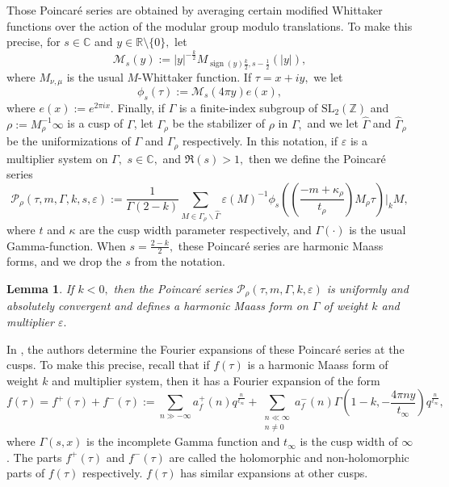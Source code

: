 \documentclass[10pt]{amsart}
\newtheorem{lemma}[theorem]{Lemma}
\theoremstyle{definition}
\theoremstyle{remark}
\numberwithin{equation}{section}
\DeclareMathOperator{\sign}{sign}
\newcommand{\C}{\mathbb C}
\newcommand{\SL}{\mathrm{SL}}
\newcommand{\RR}{\mathbb R}
\newcommand{\Z}{\mathbb Z}
\begin{document}
	Those Poincar\'e series are obtained by averaging certain modified Whittaker functions over the action of the modular group modulo translations. To make this precise,  for $s\in\C$ and $y\in\RR\setminus\{0\},$ let
	$$
	\mathcal{M}_s(y):=|y|^{-\frac{k}{2}}M_{\sign(y)\frac{k}{2},s-\frac{1}{2}}(|y|),
	$$
	where $M_{\nu,\mu}$ is the usual $M$-Whittaker function. If $\tau=x+iy,$ we let
	\begin{equation}\label{PoincareComponent}
		\phi_s(\tau):=\mathcal{M}_s(4\pi y)e(x),
	\end{equation}
	where $e(x):=e^{2\pi i x}.$ Finally, if $\Gamma$ is a finite-index subgroup of $\SL_2(\Z)$ and $\rho:=M_\rho^{-1}\infty$ is a cusp of $\Gamma$, let $\Gamma_\rho$ be the stabilizer of $\rho$ in $\Gamma,$ and we let $\widehat{\Gamma}$ and $\widehat{\Gamma}_\rho$ be the uniformizations of $\Gamma$ and $\Gamma_\rho$ respectively. 
	In this notation, if $\varepsilon$ is a multiplier system on $\Gamma,$  $s\in\C,$ and $\Re(s)>1,$ then we define the Poincar\'e series
	$$
	\mathcal{P}_{\rho}(\tau,m,\Gamma,k,s,\varepsilon):=\frac{1}{\Gamma(2-k)}\sum\limits_{M\in\widehat{\Gamma}_\rho\backslash\widehat{\Gamma}}\varepsilon(M)^{-1}\phi_s\left(\left(\frac{-m+\kappa_\rho}{t_\rho}\right) M_\rho\tau\right)\Bigg|_{k}M,
	$$ 
	where $t$ and $\kappa$ are the cusp width parameter respectively, and  $\Gamma(\cdot)$ is the usual Gamma-function. When $s=\frac{2-k}{2},$ these Poincar\'e series are harmonic Maass forms, and we drop the $s$ from the notation.
	
	\begin{lemma}
		If $k<0,$ then the Poincar\'e series $\mathcal{P}_{\rho}(\tau,m,\Gamma,k,\varepsilon)$ is uniformly and absolutely convergent and defines a harmonic Maass form on $\Gamma$ of weight $k$ and multiplier $\varepsilon.$
	\end{lemma}
	
	In \cite{BringmannOno}, the authors determine the Fourier expansions of these Poincar\'e series at the cusps. To make this precise, recall that if $f(\tau)$ is a harmonic Maass form of weight $k$ and multiplier system, then it has a Fourier expansion of the form
	$$
	f(\tau)=f^+(\tau)+f^{-}(\tau):= \sum\limits_{n\gg-\infty}a_f^{+}(n)q^{\frac{n}{t_\infty}}+\sum\limits_{\substack{n\ll\infty \\ n\neq 0}}a_f^{-}(n)\Gamma\left(1-k,-\frac{4\pi n y}{t_\infty}\right)q^\frac{n}{t_\infty},
	$$
	where $\Gamma(s,x)$ is the incomplete Gamma function and $t_\infty$ is the cusp width of $\infty$. The parts $f^+(\tau)$ and $f^{-}(\tau)$ are called the holomorphic and non-holomorphic parts of $f(\tau)$ respectively. $f(\tau)$ has similar expansions at other cusps. 
	
\end{document}
